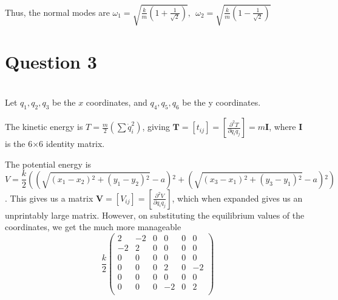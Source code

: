 \documentclass[12pt]{article}
\begin{document}
Thus, the normal modes are $\boxed{\omega_1=\sqrt{\frac{k}{m}\left(1+\frac1{\sqrt{2}}\right)},~~\omega_2=\sqrt{\frac{k}{m}\left(1-\frac1{\sqrt{2}}\right)}}$
\section{Question 3}
\\
 Let $q_1,q_2,q_3$ be the $x$ coordinates, and $q_4,q_5,q_6$ be the y coordinates.

The kinetic energy is $T=\frac{m}2(\sum \dot q_i^2)$, giving $\mathbf T=[t_{ij}]=\left[\frac{\partial^2 T}{\partial \dot q_i \dot q_j}\right]=m\mathbf I$, where $\mathbf I$ is the 6$\times$6 identity matrix.

\newcommand{\dxsq}[2]{(x_#1-x_#2)^2}
\newcommand{\dysq}[2]{(y_#1-y_#2)^2}
The potential energy is $$V=\frac{k}2\left(\left(\sqrt{\left(x_1-x_2\right){}^2+\left(y_1-y_2\right){}^2}-a\right){}^2+\left(\sqrt{\left(x_3-x_1\right){}^2+\left(y_3-y_1\right){}^2}-a\right){}^2\right)$$. This gives us a matrix $\mathbf V=[V_{ij}]=\left[\frac{\partial^2 V}{\partial q_i  q_j}\right]$, which when expanded gives us an unprintably large matrix. However, on substituting the equilibrium values of the coordinates, we get the much more manageable
$$\frac{k}2\begin{pmatrix}

 2 & -2 & 0 & 0 & 0 & 0 \\
 -2 & 2 & 0 & 0 & 0 & 0 \\
 0 & 0 & 0 & 0 & 0 & 0 \\
 0 & 0 & 0 & 2 & 0 & -2 \\
 0 & 0 & 0 & 0 & 0 & 0 \\
 0 & 0 & 0 & -2 & 0 & 2 \\


\end{pmatrix}$$
\end{document}
